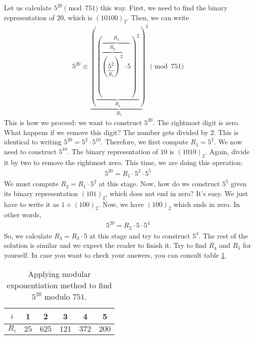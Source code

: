 \documentclass{subfile}
\begin{document}
	\begin{example}
		Let us calculate $5^{20} \pmod{751}$ this way. First, we need to find the binary representation of $20$, which is $(10100)_2$. Then, we can write
			\begin{align*}
				5^{20} \equiv  \underbrace{\left(\underbrace{\left(\overbrace{\overbrace{\left(\underbrace{5^2}_{R_1}\right)^2}^{R_2} \cdot 5}^{R_3}\right)^2}_{R_4}\right)^2}_{R_5} \pmod{751}
			\end{align*}
		This is how we proceed: we want to construct $5^{20}$. The rightmost digit is zero. What happens if we remove this digit? The number gets divided by $2$. This is identical to writing $5^{20} = 5^2 \cdot 5^{10}$. Therefore, we first compute $R_1=5^2$. We now need to construct $5^{10}$. The binary representation of $10$ is $(1010)_2$. Again, divide it by two to remove the rightmost zero. This time, we are doing this operation:
			\begin{align*}
				5^{20} = R_1 \cdot 5^2 \cdot 5^5
			\end{align*}
		We must compute $R_2 = R_1 \cdot 5^2$ at this stage. Now, how do we construct $5^5$ given its binary representation $(101)_2$, which does not end in zero? It's easy. We just have to write it as $1+(100)_2$. Now, we have $(100)_2$ which ends in zero. In other words,
			\begin{align*}
				5^{20} = R_2 \cdot 5 \cdot 5^4
			\end{align*}
		So, we calculate $R_3 = R_2 \cdot 5$ at this stage and try to construct $5^4$. The rest of the solution is similar and we expect the reader to finish it. Try to find $R_4$ and $R_5$ for yourself. In case you want to check your answers, you can consult table \ref{table:modexp}.

		\begin{table}[ht]
			\centering
			\begin{tabular}{|c|c|c|c|c|c|}
				\hline
				$i$ & 1 & 2 & 3 & 4 & 5  \\
				\hline
				$R_i$ & $25$ & $625$ &  $121$ & $372$ & $200$\\
				\hline
			\end{tabular}
			\caption{Applying modular exponentiation method to find $5^{20}$ modulo $751$.}
			\label{table:modexp}
		\end{table}
	\end{example}
\end{document}
